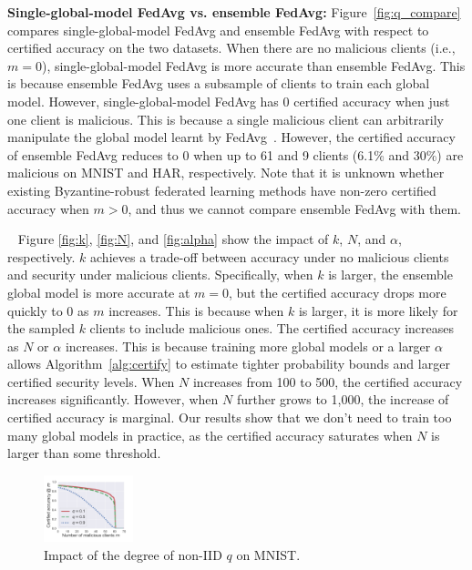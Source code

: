 \documentclass[letterpaper]{article} %
\newcommand{\myparatight}[1]{\smallskip\noindent{\bf {#1}:}~}
\begin{document}
\noindent
{\bf Single-global-model FedAvg vs. ensemble FedAvg:} Figure~\ref{fig:q_compare} compares single-global-model FedAvg and ensemble FedAvg with respect to certified accuracy on the two datasets. 
When there are no malicious clients (i.e., $m=0$), single-global-model FedAvg is more accurate than ensemble FedAvg. This is because ensemble FedAvg uses a subsample of clients to train each global model. 
However, single-global-model FedAvg has 0 certified accuracy when just one client is malicious. This is because a single malicious client can arbitrarily manipulate the global model learnt by FedAvg~\cite{Blanchard17}. However, the certified accuracy of ensemble FedAvg reduces to 0 when up to 61 and 9 clients (6.1\% and 30\%) are malicious on MNIST and HAR, respectively. Note that it is unknown whether existing Byzantine-robust federated learning methods have non-zero certified accuracy when $m>0$, and thus we cannot compare ensemble FedAvg with them.  

\myparatight{Impact of $k$, $N$, and $\alpha$} Figure \ref{fig:k}, \ref{fig:N}, and  \ref{fig:alpha} show the impact of $k$, $N$, and $\alpha$, respectively. $k$ achieves a trade-off between accuracy under no malicious clients and security under malicious clients. 
Specifically, when $k$ is larger, the ensemble global model is more accurate at $m=0$, but the certified accuracy drops more quickly to 0 as $m$ increases. This is because when $k$ is larger, it is more likely for the sampled $k$ clients to include malicious ones.  
The certified accuracy increases as $N$ or $\alpha$ increases. This is because training more global models or a larger $\alpha$ allows Algorithm~\ref{alg:certify} to estimate tighter probability bounds and larger certified security levels. When $N$ increases from 100 to 500,  the certified accuracy increases significantly. However, when $N$ further grows to 1,000, the increase of certified accuracy is marginal. Our results show that  we don't need to train too many global models in practice, as the certified accuracy saturates when $N$ is larger than some threshold.   

\begin{figure}[!t]
    \center
    \includegraphics[width=0.23\textwidth]{./figs/mnist/mnist_cnn_k10_bias.pdf}
    \vspace{-3mm}
    \caption{Impact of the degree of non-IID $q$ on MNIST.}
    \label{fig:q}
\end{figure}
\end{document}
